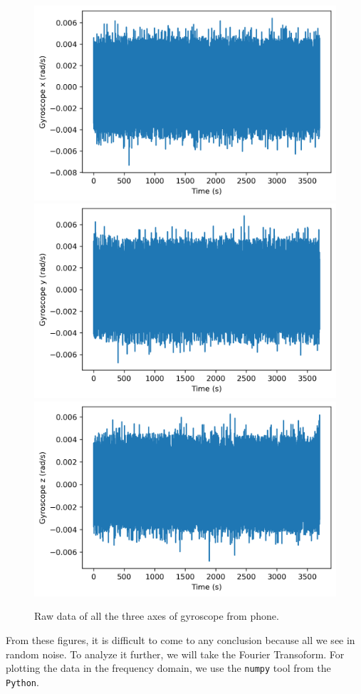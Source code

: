 \documentclass[a4paper]{article}
\begin{document}
\begin{figure}[hbt!]
     \centering
	 {{\includegraphics[width=0.4\columnwidth]{raw_x.png}}}
	 {{\includegraphics[width=0.4\columnwidth]{raw_y.png}}}
	 {{\includegraphics[width=0.4\columnwidth]{raw_z.png}}}
     \caption{Raw data of all the three axes of gyroscope from phone.}
	 \label{fig:raw}
\end{figure}

From these figures, it is difficult to come to any conclusion because all we see in random noise. To analyze it further, we will take the Fourier Transoform. For plotting the data in the frequency domain, we use the \texttt{numpy} tool from the \texttt{Python}. 
\end{document}
